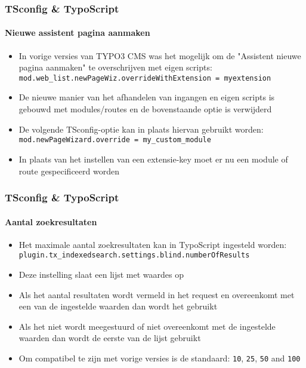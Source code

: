 \begin{frame}[fragile]
	\frametitle{TSconfig \& TypoScript}
	\framesubtitle{Nieuwe assistent pagina aanmaken}

	\begin{itemize}
		\item In vorige versies van TYPO3 CMS was het mogelijk om de "Assistent nieuwe pagina aanmaken"
		 	te overschrijven met eigen scripts:\newline
			\small
				\texttt{mod.web\_list.newPageWiz.overrideWithExtension = myextension}
			\normalsize
		\item De nieuwe manier van het afhandelen van ingangen en eigen scripts is gebouwd met modules/routes
		 	en de bovenstaande optie is verwijderd
		\item De volgende TSconfig-optie kan in plaats hiervan gebruikt worden:
			\small
				\texttt{mod.newPageWizard.override = my\_custom\_module}
			\normalsize

		\item In plaats van het instellen van een extensie-key moet er nu een module of
		 	route gespecificeerd worden

	\end{itemize}

\end{frame}
\begin{frame}[fragile]
	\frametitle{TSconfig \& TypoScript}
	\framesubtitle{Aantal zoekresultaten}

	\begin{itemize}
		\item Het maximale aantal zoekresultaten kan in TypoScript ingesteld worden:\newline
			\texttt{plugin.tx\_indexedsearch.settings.blind.numberOfResults}
		\item Deze instelling slaat een lijst met waardes op
		\item Als het aantal resultaten wordt vermeld in het request en overeenkomt met een van
			de ingestelde waarden dan wordt het gebruikt
		\item Als het niet wordt meegestuurd of niet overeenkomt met de ingestelde waarden dan
		 	wordt de eerste van de lijst gebruikt
		\item Om compatibel te zijn met vorige versies is de standaard:\newline
			\texttt{10}, \texttt{25}, \texttt{50} and \texttt{100}
	\end{itemize}

\end{frame}
